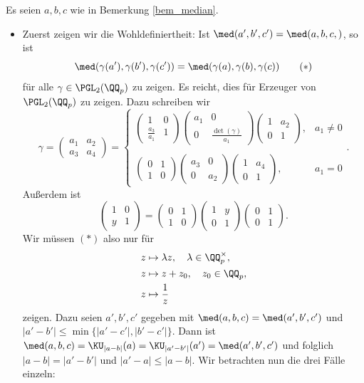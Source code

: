 \bew Es seien $a,b,c$ wie in Bemerkung
\ref{bem_median}.
\begin{itemize}
\item Zuerst zeigen wir die Wohldefiniertheit:
Ist $\med(a',b',c')=\med(a,b,c,)$, so ist
\[
\med(\gamma(a'),\gamma(b'),\gamma(c'))
=\med(\gamma(a),\gamma(b),\gamma(c))
\qquad (*)
\]
für alle $\gamma\in\PGL_2(\QQ_p)$ zu zeigen.
Es reicht, dies für Erzeuger von $\PGL_2(\QQ_p)$ zu zeigen.
Dazu schreiben wir
\[
\gamma = \begin{pmatrix} a_1 & a_2 \\ a_3 & a_4 \end{pmatrix}
=
\left\{\begin{matrix}
\begin{pmatrix} 1 & 0 \\ \frac{a_3}{a_1} & 1 \end{pmatrix}
\begin{pmatrix} a_1 & 0 \\ 0 & \frac{\det(\gamma)}{a_1} \end{pmatrix}
\begin{pmatrix} 1 & a_2 \\ 0 & 1 \end{pmatrix}, & a_1\neq 0 \\ \\
\begin{pmatrix} 0 & 1 \\ 1 & 0 \end{pmatrix}
\begin{pmatrix} a_3 & 0 \\ 0 & a_2 \end{pmatrix}
\begin{pmatrix} 1 & a_4 \\ 0 & 1 \end{pmatrix}, & a_1=0
\end{matrix}\right..
\]
Außerdem ist
\[
\begin{pmatrix} 1 & 0 \\ y & 1 \end{pmatrix}
=
\begin{pmatrix} 0 & 1 \\ 1 & 0 \end{pmatrix}
\begin{pmatrix} 1 & y \\ 0 & 1 \end{pmatrix}
\begin{pmatrix} 0 & 1 \\ 0 & 1 \end{pmatrix}.
\]
Wir müssen $(*)$ also nur für
\begin{align*}
&z\mapsto \lambda z,\quad \lambda \in \QQ_p^\times, \\
&z\mapsto z+z_0,\quad z_0 \in \QQ_p, \\
&z\mapsto\frac{1}{z}
\end{align*}
zeigen.
Dazu seien $a',b',c'$ gegeben mit $\med(a,b,c)=\med(a',b',c')$
und $|a'-b'|\leq\min\{|a'-c'|,|b'-c'|\}$.
Dann ist
$\med(a,b,c)=\KU_{|a-b|}(a)=\KU_{|a'-b'|}(a')=\med(a',b',c')$ und
folglich $|a-b|=|a'-b'|$ und $|a'-a|\leq|a-b|$.
Wir betrachten nun die drei Fälle einzeln:


\end{itemize}
